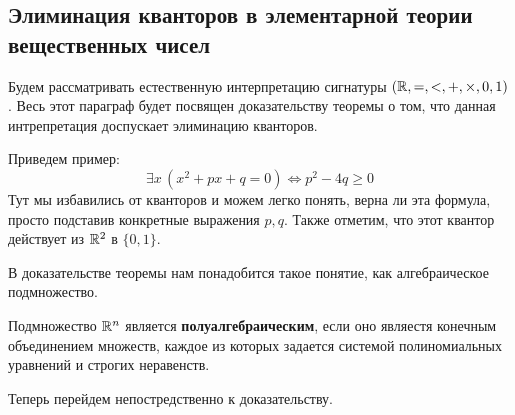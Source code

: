 \subsection{Элиминация кванторов в элементарной теории вещественных чисел}
Будем рассматривать естественную интерпретацию сигнатуры $(\mathbb{R}, =, <, +, \times, 0, 1)$. Весь этот параграф будет посвящен доказательству теоремы о том, что данная интрепретация доспускает элиминацию кванторов. 

Приведем пример: \[ \exists x \, (x^2 + px + q = 0) \Leftrightarrow p^2 - 4q \geqslant 0 \]
Тут мы избавились от кванторов и можем легко понять, верна ли эта формула, просто подставив конкретные выражения $p, q$. Также отметим, что этот квантор действует из $\mathbb{R}^2$ в $\{0, 1\}$.

В доказательстве теоремы нам понадобится такое понятие, как алгебраическое подмножество.

\begin{conj}
    Подмножество $\mathbb{R}^n$ является \textbf{полуалгебраическим}, если оно являестя конечным объединением множеств, каждое из которых задается системой полиномиальных уравнений и строгих неравенств.
\end{conj}

Теперь перейдем непостредственно к доказательству.

\vspace{4mm}

